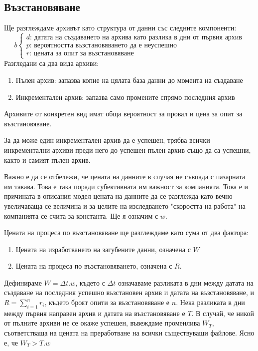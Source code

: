 \documentclass[11pt, a4paper]{article}
\theoremstyle{definition}
\begin{document}
	\subsection{Възстановяване}
		Ще разглеждаме архивът като структура от данни със следните компоненти:
		$$
		b
		\begin{cases}
		d \text{: датата на създаването на архива като разлика в дни от първия архив}\\
		p \text{: вероятността възстановяването да е неуспешно}\\
		r \text{: цената за опит за възстановяване}
		\end{cases}
		$$
		Разгледани са два вида архиви:
		\begin{enumerate}
			\item Пълен архив: запазва копие на цялата база данни до момента на създаване
			\item Инкрементален архив: запазва само промените спрямо последния архив
		\end{enumerate}
		Архивите от конкретен вид имат обща вероятност за провал и цена за опит за възстановяване. \par
		За да може един инкрементален архив да е успешен, трябва всички инкрементални архиви преди него до успешен пълен архив също да са успешни, както и самият пълен архив.\par
		Важно е да се отбележи, че цената на данните в случая не съвпада с пазарната им такава. Това е така поради субективната им важност за компанията. Това е и причината в описания модел цената на данните да се разглежда като вечно увеличаваща се величина и за целите на изследването "скоростта на работа" на компанията се счита за константа. Ще я означим с $w$.\par
		Цената на процеса по възстановяване ще разглеждаме като сума от два фактора:
		\begin{enumerate}
			\item Цената на изработването на загубените данни, означена с $W$
			\item Цената на процеса по възстановяването, означена с $R$.
		\end{enumerate}
		Дефинираме $W = \Delta t.w$, където с $\Delta t$ означаваме разликата в дни между датата на създаване на последния успешно възстановен архив и датата на възстановяване, и $R = \sum_{i=1}^{n} r_i$, където броят опити за възстановяване е $n$.
		Нека разликата в дни между първия направен архив и датата на възстановяване е $T$. В случай, че никой от пълните архиви не се окаже успешен, въвеждаме променлива $W_T$, съответстваща на цената на преработване на всички съществуващи файлове. Ясно е, че $W_T>T.w$\par
\end{document}
